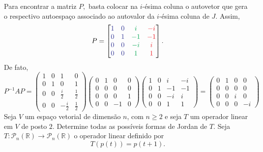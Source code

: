 \documentclass[11pt,a4paper]{article}
\begin{document}
{ Para encontrar a matriz $P,$ basta colocar na $i$-ésima coluna o autovetor que gera o respectivo autoespaço associado ao autovalor da $i$-ésima coluna de $J.$ Assim,
 \[
 P = \begin{bmatrix} \textcolor{Blue}{1} & \textcolor{Blue}{0} & \textcolor{Green}{i} & \textcolor{Red}{-i} \\
 \textcolor{Blue}{0} & \textcolor{Blue}{1} & \textcolor{Green}{-1} & \textcolor{Red}{-1} \\
 \textcolor{Blue}{0} & \textcolor{Blue}{0} & \textcolor{Green}{-i} & \textcolor{Red}{i} \\
 \textcolor{Blue}{0} & \textcolor{Blue}{0} & \textcolor{Green}{1} & \textcolor{Red}{1} \\ \end{bmatrix}.
 \]
 De fato,
 \[
 P^{-1}AP = \left(\begin{matrix}
1 & 0 & 1 & 0 \\
0 & 1 & 0 & 1 \\
0 & 0 & \frac{i}{2} & \frac{1}{2} \\
0 & 0 & -\frac{i}{2} & \frac{1}{2}
\end{matrix}\right) \left(\begin{matrix}
0 & 1 &0 & 0 \\
0 &0 & 0 & 0 \\
0 & 0 & 0 &1 \\
0 & 0 & -1 & 0
\end{matrix}\right) \left(\begin{matrix}
1 & 0 & i & -i \\
0 & 1 & -1 & -1 \\
0 & 0 & -i & i \\
0 & 0 & 1 & 1
\end{matrix}\right) = \left(\begin{matrix}
0 & 1 & 0 & 0 \\
0 & 0 & 0 & 0 \\
0 & 0 & i & 0 \\
0 & 0 & 0 & -i
\end{matrix}\right)
 \]
                 }
     Seja $V$ um espaço vetorial de dimensão $n$, com $n \ge 2$ e seja $T$ um operador linear em $V$ de posto $2.$ Determine todas as possíveis formas de Jordan de $T.$
                 \solucao{}
     Seja $T \colon \mathcal{P}_n(\mathbb{R}) \to \mathcal{P}_n(\mathbb{R}) $ o operador linear definido por 
    \[T(p(t)) = p(t + 1).\]
\end{document}
